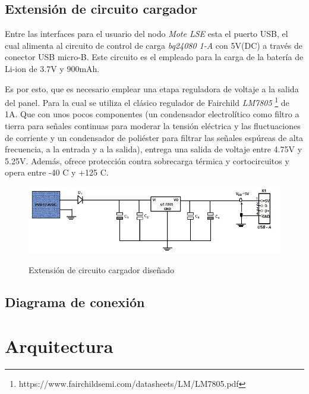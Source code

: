 \subsection{Extensión de circuito cargador}
\label{sec:extensión}
Entre las interfaces para el usuario del nodo \textit{Mote LSE} esta el puerto USB, el cual alimenta al circuito de control de carga \textit{bq24080 1-A} con 5V(DC) a través de conector USB micro-B. Este circuito es el empleado para la carga de la batería de Li-ion de 3.7V y 900mAh.

Es por esto, que es necesario emplear una etapa reguladora de voltaje a la salida del panel. Para la cual se utiliza el clásico regulador de Fairchild \textit{LM7805} \footnote{https://www.fairchildsemi.com/datasheets/LM/LM7805.pdf} de 1A. Que con unos pocos componentes (un condensador electrolítico como filtro a tierra para señales continuas para moderar la tensión eléctrica y las fluctuaciones de corriente y un condensador de poliéster para filtrar las señales espúreas de alta frecuencia, a la entrada y a la salida), entrega una salida de voltaje entre 4.75V y 5.25V. Además, ofrece protección contra sobrecarga térmica y cortocircuitos y opera entre -40 \grados C y +125 \grados C.

\begin{figure}[h!]
	\centering
    \includegraphics[width=1\textwidth]{./Figures/circuito.jpg}
	\label{fig:circuito}
	\caption{Extensión de circuito cargador diseñado}
\end{figure}

\subsection{Diagrama de conexión}
\label{sec:conexión}


\section{Arquitectura}
\label{sec:arq}

